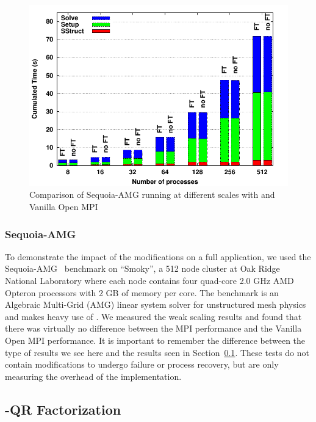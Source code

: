 \begin{figure}[t]
    \centering
    \includegraphics[width=.8\linewidth]{figures/bargraph}
    \caption{Comparison of Sequoia-AMG running at different scales with \ulfm and Vanilla Open MPI}
    \label{fig:ulfm:sequoia}
\end{figure}

\subsubsection{Sequoia-AMG}

To demonstrate the impact of the \ulfm modifications on a full application, we 
used the Sequoia-AMG~\cite{sequoiaAMG} benchmark on ``Smoky'', a 512 node cluster at Oak 
Ridge National Laboratory where each node contains four quad-core 2.0 GHz AMD 
Opteron processors with 2 GB of memory per core. The benchmark is an Algebraic 
Multi-Grid (AMG) linear system solver for unstructured mesh physics and makes 
heavy use of \mpi. We measured the weak scaling results and found that there was 
virtually no difference between the \ulfm MPI performance and the Vanilla Open MPI 
performance. It is important to remember the difference between the type of 
results we see here and the results seen in 
Section~\ref{subsec:ulfm:performance:qr}. These tests do not contain modifications 
to undergo failure or process recovery, but are only measuring the overhead of the 
\mpi implementation.

\subsection{\abft-QR Factorization}
\label{subsec:ulfm:performance:qr}

